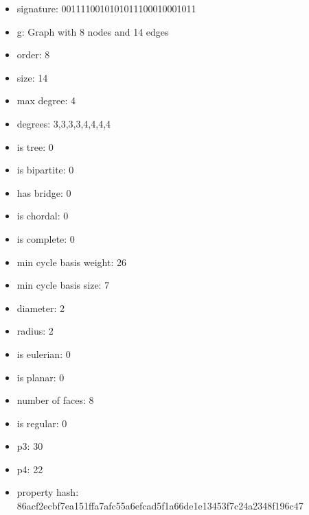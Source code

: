 \begin{itemize}
\item signature: 0011110010101011100010001011
\item g: Graph with 8 nodes and 14 edges
\item order: 8
\item size: 14
\item max degree: 4
\item degrees: 3,3,3,3,4,4,4,4
\item is tree: 0
\item is bipartite: 0
\item has bridge: 0
\item is chordal: 0
\item is complete: 0
\item min cycle basis weight: 26
\item min cycle basis size: 7
\item diameter: 2
\item radius: 2
\item is eulerian: 0
\item is planar: 0
\item number of faces: 8
\item is regular: 0
\item p3: 30
\item p4: 22
\item property hash: 86acf2ecbf7ea151ffa7afc55a6efcad5f1a66de1e13453f7c24a2348f196c47
\end{itemize}
\newpage
\begin{figure}
\end{figure}
